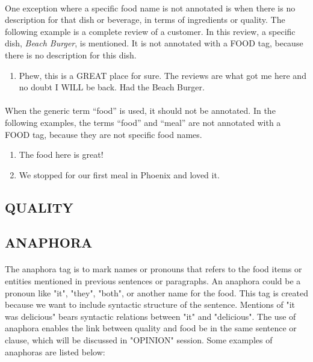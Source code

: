 \documentclass{article}
\begin{document}
\paragraph{}
One exception where a specific food name is not annotated is when there is no description for that dish or beverage, in terms of ingredients or quality. The following example is a complete review of a customer. In this review, a specific dish, \textit{Beach Burger}, is mentioned. It is not annotated with a FOOD tag, because there is no description for this dish.

\begin{enumerate}[resume]
\item Phew, this is a GREAT place for sure. The reviews are what got me here and no doubt I WILL be back. Had the Beach Burger.
\end{enumerate}

\paragraph{}
When the generic term ``food'' is used, it should not be annotated. In the following examples, the terms ``food'' and ``meal'' are not annotated with a FOOD tag, because they are not specific food names. 
\begin{enumerate}[resume]
\item The food here is great!
\item We stopped for our first meal in Phoenix and loved it.
\end{enumerate}


\subsection{QUALITY}
\paragraph{}


\subsection{ANAPHORA}
\paragraph{}
The anaphora tag is to mark names or pronouns that refers to the food items or entities mentioned in previous sentences or paragraphs. An anaphora could be a pronoun like "it", "they", "both", or another name for the food. This tag is created because we want to include syntactic structure of the sentence. Mentions of "it was delicious" bears syntactic relations between "it" and "delicious". The use of anaphora enables the link between quality and food be in the same sentence or clause, which will be discussed in "OPINION" session. Some examples of anaphoras are listed below:
\end{document}
